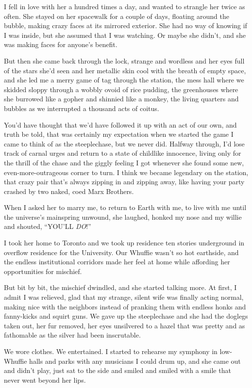 I fell in love with her a hundred times a day, and wanted to
strangle her twice as often. She stayed on her spacewalk for a
couple of days, floating around the bubble, making crazy faces at
its mirrored exterior. She had no way of knowing if I was inside,
but she assumed that I was watching. Or maybe she didn't, and she
was making faces for anyone's benefit.

But then she came back through the lock, strange and wordless and
her eyes full of the stars she'd seen and her metallic skin cool
with the breath of empty space, and she led me a merry game of tag
through the station, the mess hall where we skidded sloppy through
a wobbly ovoid of rice pudding, the greenhouses where she burrowed
like a gopher and shinnied like a monkey, the living quarters and
bubbles as we interrupted a thousand acts of coitus.

You'd have thought that we'd have followed it up with an act of our
own, and truth be told, that was certainly my expectation when we
started the game I came to think of as the steeplechase, but we
never did. Halfway through, I'd lose track of carnal urges and
return to a state of childlike innocence, living only for the
thrill of the chase and the giggly feeling I got whenever she found
some new, even-more-outrageous corner to turn. I think we became
legendary on the station, that crazy pair that's always zipping in
and zipping away, like having your party crashed by two naked, coed
Marx Brothers.

When I asked her to marry me, to return to Earth with me, to live
with me until the universe's mainspring unwound, she laughed,
honked my nose and my willie and shouted, “YOU'LL \emph{DO}!”

I took her home to Toronto and we took up residence ten stories
underground in overflow residence for the University. Our Whuffie
wasn't so hot earthside, and the endless institutional corridors
made her feel at home while affording her opportunities for
mischief.

But bit by bit, the mischief dwindled, and she started talking
more. At first, I admit I was relieved, glad that my strange,
silent wife was finally acting normal, making nice with the
neighbors instead of pranking them with endless honks and
fanny-kicks and squirt guns. We gave up the steeplechase and she
had the doglegs taken out, her fur removed, her eyes unsilvered to
a hazel that was pretty and as fathomable as the silver had been
inscrutable.

We wore clothes. We entertained. I started to rehearse my symphony
in low-Whuffie halls and parks with any musicians I could drum up,
and she came out and didn't play, just sat to the side and smiled
and smiled with a smile that never went beyond her lips.

